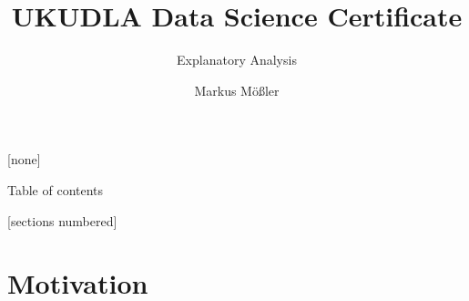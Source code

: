 \documentclass[10pt,aspectratio=169]{beamer}
\title{UKUDLA Data Science Certificate}
\subtitle{Explanatory Analysis}
\author{Markus Mößler}
\institute{University of Hohenheim}
\begin{document}
\maketitle

{
[none]

\begin{frame}[noframenumbering]{Table of contents}

  \small
  [sections numbered]
  \tableofcontents[hideallsubsections]

\end{frame}
}



\section{Motivation}
\end{document}
